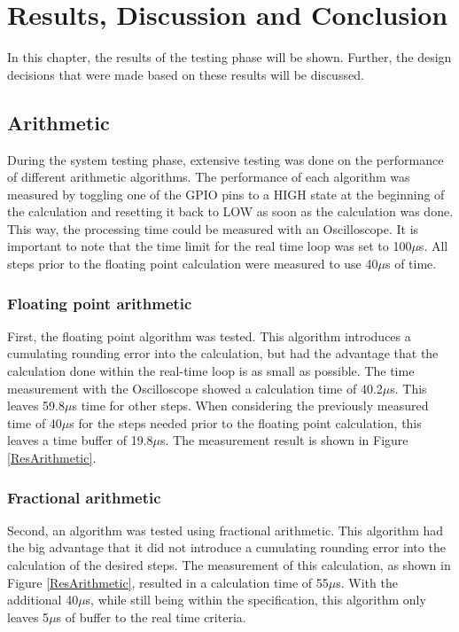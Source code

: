 \chapter{Results, Discussion and Conclusion}
\label{resultanddiscussion}
In this chapter, the results of the testing phase will be shown. Further, the design decisions that were made based on these results will be discussed.
 
\section{Arithmetic}
During the system testing phase, extensive testing was done on the performance of different arithmetic algorithms. The performance of each algorithm was measured by toggling one of the GPIO pins to a HIGH state at the beginning of the calculation and resetting it back to LOW as soon as the calculation was done. This way, the processing time could be measured with an Oscilloscope.
It is important to note that the time limit for the real time loop was set to 100$\mu$s. All steps prior to the floating point calculation were measured to use 40$\mu$s of time.
 
\subsection{Floating point arithmetic}
First, the floating point algorithm was tested. This algorithm introduces a cumulating rounding error into the calculation, but had the advantage that the calculation done within the real-time loop is as small as possible. The time measurement with the Oscilloscope showed a calculation time of 40.2$\mu$s. This leaves 59.8$\mu$s time for other steps. When considering the previously measured time of 40$\mu$s for the steps needed prior to the floating point calculation, this leaves a time buffer of 19.8$\mu$s. The measurement result is shown in Figure \ref{ResArithmetic}.
 
\subsection{Fractional arithmetic}
Second, an algorithm was tested using fractional arithmetic. This algorithm had the big advantage that it did not introduce a cumulating rounding error into the calculation of the desired steps. The measurement of this calculation, as shown in Figure \ref{ResArithmetic}, resulted in a calculation time of 55$\mu$s. With the additional 40$\mu$s, while still being within the specification, this algorithm only leaves 5$\mu$s of buffer to the real time criteria.
 
